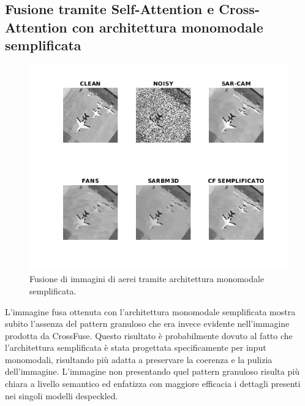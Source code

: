 \subsection{Fusione tramite Self-Attention e Cross-Attention con architettura monomodale semplificata}
\begin{figure}[H] 
  \centering
  \includegraphics[width=1.1\textwidth]{utils/CFLairplane00.png}
  \caption{Fusione di immagini di aerei tramite architettura monomodale semplificata.}
  \label{fig:airplane00CFL}
\end{figure}
L’immagine fusa ottenuta con l’architettura monomodale semplificata mostra subito l’assenza del 
pattern granuloso che era invece evidente nell’immagine prodotta da CrossFuse. Questo risultato è 
probabilmente dovuto al fatto che l’architettura semplificata è stata progettata specificamente 
per input monomodali, risultando più adatta a preservare la coerenza e la pulizia dell’immagine. 
L'immagine non presentando quel pattern granuloso risulta più chiara a livello semantico ed enfatizza con 
maggiore efficacia i dettagli presenti nei singoli modelli despeckled.
